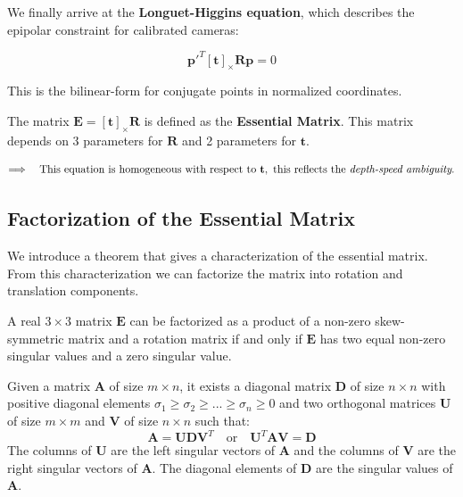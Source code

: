 \documentclass[11pt,a4paper]{article}
\theoremstyle{definition}
\theoremstyle{plain}
\theoremstyle{remark}
\begin{document}
We finally arrive at the \textbf{Longuet-Higgins equation}, which describes the epipolar constraint for calibrated cameras:

\begin{tcolorbox}[colback=blue!5!white,colframe=blue!75!black,title=Longuet-Higgins Equation]
\begin{equation} \label{eq:longuet_higgins_final}
    \mathbf{p'}^{T} [\mathbf{t}]_{\times} \mathbf{R} \mathbf{p} = 0
\end{equation}
\end{tcolorbox}
This is the bilinear-form for conjugate points in normalized coordinates.

\begin{tcolorbox}[colback=orange!5!white,colframe=orange!75!black,title=Essential Matrix]
The matrix $\mathbf{E} = [\mathbf{t}]_{\times} \mathbf{R}$ is defined as the \textbf{Essential Matrix}.
This matrix depends on 3 parameters for $\mathbf{R}$ and 2 parameters for $\mathbf{t}$.
\end{tcolorbox}

\[
    \Longrightarrow \quad \text{This equation is homogeneous with respect to } \mathbf{t}, \text{ this reflects the \emph{depth-speed ambiguity}.}
\]

\subsection{Factorization of the Essential Matrix}

We introduce a theorem that gives a characterization of the essential matrix.
From this characterization we can factorize the matrix into rotation and translation components.

\begin{tcolorbox}[colback=purple!5!white,colframe=purple!75!black,title=Factorization Theorem]
A real $3 \times 3$ matrix $\mathbf{E}$ can be factorized as a product of a non-zero skew-symmetric
matrix and a rotation matrix if and only if $\mathbf{E}$ has two equal non-zero singular values
and a zero singular value.
\end{tcolorbox}

\begin{tcolorbox}[colback=green!5!white,colframe=green!75!black,title=Singular Value Decomposition]
Given a matrix $\mathbf{A}$ of size $m \times n$, it exists a diagonal matrix
$\mathbf{D}$ of size $n \times n$ with positive diagonal elements
$\sigma_1 \geq \sigma_2 \geq ... \geq \sigma_n \geq 0$ and two orthogonal matrices $\mathbf{U}$ of size $m \times m$
and $\mathbf{V}$ of size $n \times n$ such that:
\[
\mathbf{A} = \mathbf{U} \mathbf{D} \mathbf{V}^T \quad \text{or} \quad \mathbf{U}^T \mathbf{A} \mathbf{V} = \mathbf{D}
\]
The columns of $\mathbf{U}$ are the left singular vectors of $\mathbf{A}$ and the columns of $\mathbf{V}$
are the right singular vectors of $\mathbf{A}$. The diagonal elements of $\mathbf{D}$ are the singular values of $\mathbf{A}$.

\end{tcolorbox}
\end{document}
